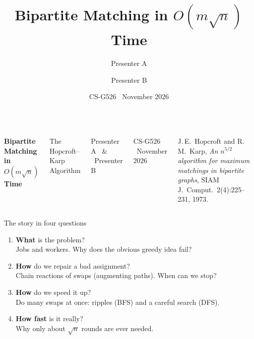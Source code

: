 \documentclass[aspectratio=169,11pt]{beamer}
\title{Bipartite Matching in $O(m\sqrt n)$ Time}
\author{Presenter A \and Presenter B}
\date{CS-G526 \textperiodcentered\ November 2026}
\begin{document}
\begin{frame}[plain]
\vspace{0.5cm}
\begin{columns}[c,onlytextwidth]
  {\color{hkblue}\Huge\bfseries Bipartite Matching\\[1mm] in $O(m\sqrt n)$ Time\par}
  \vspace{4mm}
  {\Large\color{black!70} The Hopcroft--Karp Algorithm\par}
  \vspace{10mm}
  {\large Presenter A \ \& \ Presenter B\par}
  \vspace{1mm}
  {\normalsize CS-G526 \textperiodcentered\ November 2026\par}
  \vspace{9mm}
  {\footnotesize\color{hkgrey}J.\,E.\ Hopcroft and R.\,M.\ Karp,
   \emph{An $n^{5/2}$ algorithm for maximum matchings in bipartite graphs},
   SIAM J.\ Comput.\ 2(4):225--231, 1973.\par}
\centering
{}
\end{columns}
\end{frame}

\begin{frame}{The story in four questions}
\Large
\begin{enumerate}\setlength\itemsep{12pt}
  \item[\textcolor{hkblue}{\textbf{A1}}] \textbf{What} is the problem?\\
  {\normalsize\color{hkgrey}Jobs and workers. Why does the obvious greedy idea fail?}
  \item[\textcolor{hkblue}{\textbf{A2}}] \textbf{How} do we repair a bad assignment?\\
  {\normalsize\color{hkgrey}Chain reactions of swaps (augmenting paths). When can we stop?}
  \item[\textcolor{hkorange}{\textbf{B1}}] \textbf{How} do we speed it up?\\
  {\normalsize\color{hkgrey}Do many swaps at once: ripples (BFS) and a careful search (DFS).}
  \item[\textcolor{hkorange}{\textbf{B2}}] \textbf{How fast} is it really?\\
  {\normalsize\color{hkgrey}Why only about $\sqrt n$ rounds are ever needed.}
\end{enumerate}
\end{frame}
\end{document}
